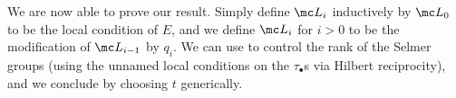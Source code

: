 \documentclass[../notes.tex]{subfiles}
\begin{document}
We are now able to prove our result. Simply define $\mc L_i$ inductively by $\mc L_0$ to be the local condition of $E$, and we define $\mc L_i$ for $i>0$ to be the modification of $\mc L_{i-1}$ by $q_i$. We can use  to control the rank of the Selmer groups (using the unnamed local conditions on the $\tau_\bullet$s via Hilbert reciprocity), and we conclude by choosing $t$ generically.
\end{document}
